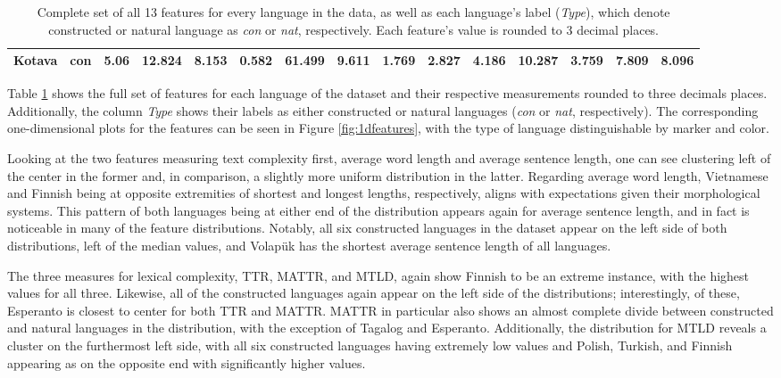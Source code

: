 \documentclass[12pt,a4paper]{article}
\numberwithin{figure}{section}
\numberwithin{table}{section}
\numberwithin{definition}{section}
\begin{document}
\begin{table}[!h]
\begin{adjustbox}{width=\textwidth}
\begin{tabular}{|l|l|l|l|l|l|l|l|l|l|l|l|l|l|l|}
        \textbf{Kotava} & con & 5.06 & 12.824 & 8.153 & 0.582 & 61.499 & 9.611 & 1.769 & 2.827 & 4.186 & 10.287 & 3.759 & 7.809 & 8.096 \\ \hline
    \end{tabular}
  \end{adjustbox}
  \caption{Complete set of all 13 features for every language in the data, as well as each language's label (\textit{Type}), which denote constructed or natural language as \textit{con} or \textit{nat}, respectively. Each feature's value is rounded to 3 decimal places.}
  \label{tbl:featurestable}
\end{table}

Table \ref{tbl:featurestable} shows the full set of features for each language of the dataset and their respective measurements rounded to three decimals places. Additionally, the column \textit{Type} shows their labels as either constructed or natural languages (\textit{con} or \textit{nat}, respectively). The corresponding one-dimensional plots for the features can be seen in Figure \ref{fig:1dfeatures}, with the type of language distinguishable by marker and color.

Looking at the two features measuring text complexity first, average word length and average sentence length, one can see clustering left of the center in the former and, in comparison, a slightly more uniform distribution in the latter. Regarding average word length, Vietnamese and Finnish being at opposite extremities of shortest and longest lengths, respectively, aligns with expectations given their morphological systems. This pattern of both languages being at either end of the distribution appears again for average sentence length, and in fact is noticeable in many of the feature distributions. Notably, all six constructed languages in the dataset appear on the left side of both distributions, left of the median values, and Volapük has the shortest average sentence length of all languages.

The three measures for lexical complexity, TTR, MATTR, and MTLD, again show Finnish to be an extreme instance, with the highest values for all three. Likewise, all of the constructed languages again appear on the left side of the distributions; interestingly, of these, Esperanto is closest to center for both TTR and MATTR. MATTR in particular also shows an almost complete divide between constructed and natural languages in the distribution, with the exception of Tagalog and Esperanto. Additionally, the distribution for MTLD reveals a cluster on the furthermost left side, with all six constructed languages having extremely low values and Polish, Turkish, and Finnish appearing as on the opposite end with significantly higher values. 
\end{document}
